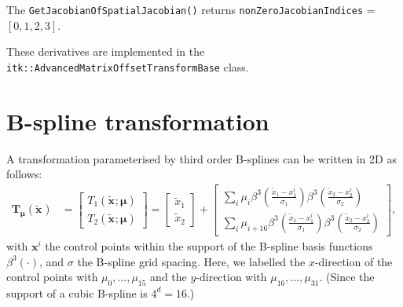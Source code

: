 \documentclass[]{article}
\newcommand{\vmu}{\bm{\mu}}
\newcommand{\vTmu}{\bm{T_{\mu}}}
\newcommand{\vx}[1][]{\bm{x}_{#1}}
\newcommand{\vxt}[1][]{\bm{\widetilde x}_{#1}}
\begin{document}

The \texttt{GetJacobianOfSpatialJacobian()} returns
\texttt{nonZeroJacobianIndices} = $[ 0, 1, 2, 3 ]$.


These derivatives are implemented in the
\texttt{itk::AdvancedMatrixOffsetTransformBase} class.

\section{B-spline transformation}

A transformation parameterised by third order B-splines can be
written in 2D as follows:
\begin{align}
\vTmu(\vxt) &= \begin{bmatrix} T_1(\vxt;\vmu) \\ T_2(\vxt;\vmu)
\end{bmatrix} = \begin{bmatrix} \widetilde{x}_1 \\ \widetilde{x}_2 \end{bmatrix}
 + \begin{bmatrix} \sum_{i} \mu_i \beta^3 \left(
\frac{ \widetilde{x}_1 - x_{1}^i}{\sigma_1} \right)
\beta^3 \left( \frac{\widetilde{x}_2 - x_{2}^i}{\sigma_2}\right) \\
 \sum_{i} \mu_{i+16} \beta^3 \left( \frac{ \widetilde{x}_1 - x_{1}^i}
 {\sigma_1} \right) \beta^3 \left( \frac{\widetilde{x}_2 - x_{2}^i}{\sigma_2} \right)
\end{bmatrix},
\end{align}
with $\vx^i$ the control points within the support of the B-spline
basis functions $\beta^3(\cdot)$, and $\sigma$ the B-spline grid
spacing. Here, we labelled the $x$-direction of the control points
with $\mu_0, \ldots, \mu_{15}$ and the $y$-direction with $\mu_{16},
\ldots, \mu_{31}$. (Since the support of a cubic B-spline is $4^d =
16$.)
\end{document}
